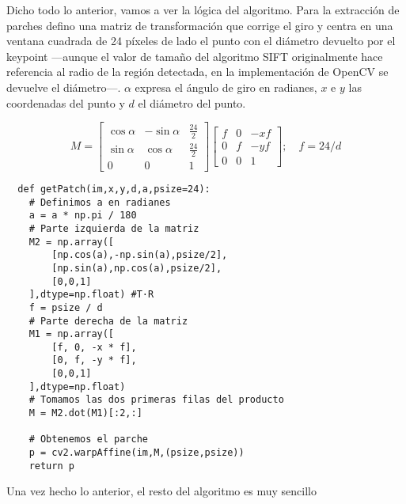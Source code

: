 \documentclass{article}
\begin{document}
Dicho todo lo anterior, vamos a ver la lógica del algoritmo. Para la extracción de parches defino una matriz de transformación que corrige el giro y centra en una ventana cuadrada de 24 píxeles de lado el punto con el diámetro devuelto por el keypoint ---aunque el valor de tamaño del algoritmo SIFT originalmente hace referencia al radio de la región detectada, en la implementación de OpenCV se devuelve el diámetro---. $\alpha$ expresa el ángulo de giro en radianes, $x$ e $y$ las coordenadas del punto y $d$ el diámetro del punto.

\[M = \begin{bmatrix}
\cos \alpha & -\sin \alpha & \frac{24}{2} \\
\sin \alpha & \cos \alpha & \frac{24}{2} \\
0 & 0 & 1
\end{bmatrix}
\begin{bmatrix}
f & 0 & -xf \\
0 & f & -yf \\
0 & 0 & 1
\end{bmatrix}; \quad f=24/d\]

\begin{verbatim}
  def getPatch(im,x,y,d,a,psize=24):
    # Definimos a en radianes
    a = a * np.pi / 180
    # Parte izquierda de la matriz
    M2 = np.array([
        [np.cos(a),-np.sin(a),psize/2],
        [np.sin(a),np.cos(a),psize/2],
        [0,0,1]
    ],dtype=np.float) #T·R
    f = psize / d
    # Parte derecha de la matriz
    M1 = np.array([
        [f, 0, -x * f],
        [0, f, -y * f],
        [0,0,1]
    ],dtype=np.float)
    # Tomamos las dos primeras filas del producto
    M = M2.dot(M1)[:2,:]
    
    # Obtenemos el parche
    p = cv2.warpAffine(im,M,(psize,psize))
    return p
\end{verbatim}

Una vez hecho lo anterior, el resto del algoritmo es muy sencillo
\end{document}

